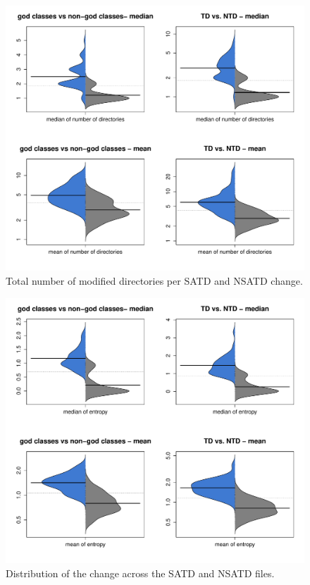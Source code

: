 \begin{figure}[!tb]
	\centering
	\includegraphics[width=120mm]{figures/chapter4/rq3_distribution_of_nd}
	\caption{Total number of modified directories per SATD and NSATD change.}
	\label{figure:number_of_directories}
\end{figure}


\begin{figure}[!tb]
	\centering
	\includegraphics[width=120mm]{figures/chapter4/rq3_distribution_of_entropy}
	\caption{Distribution of the change across the SATD and NSATD files.}
	\label{figure:mtdocatdf}
\end{figure}



